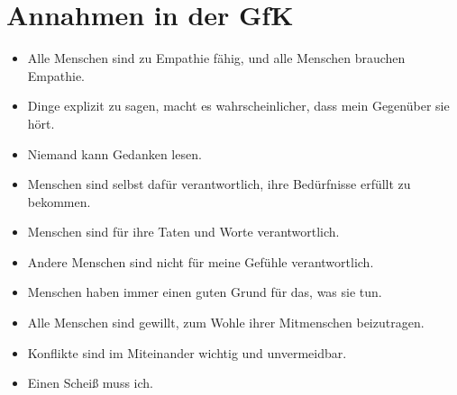 \section{Annahmen in der GfK}
\label{gfk-annahmen}

\begin{itemize}
  \item Alle Menschen sind zu Empathie fähig, und alle Menschen brauchen Empathie.
  \item Dinge explizit zu sagen, macht es wahrscheinlicher, dass mein Gegenüber sie hört.
  \item Niemand kann Gedanken lesen.
  \item Menschen sind selbst dafür verantwortlich, ihre Bedürfnisse erfüllt zu bekommen.
  \item Menschen sind für ihre Taten und Worte verantwortlich.
  \item Andere Menschen sind nicht für meine Gefühle verantwortlich.
  \item Menschen haben immer einen guten Grund für das, was sie tun.
  \item Alle Menschen sind gewillt, zum Wohle ihrer Mitmenschen beizutragen.
  \item Konflikte sind im Miteinander wichtig und unvermeidbar.
  \item Einen Scheiß muss ich.
\end{itemize}
